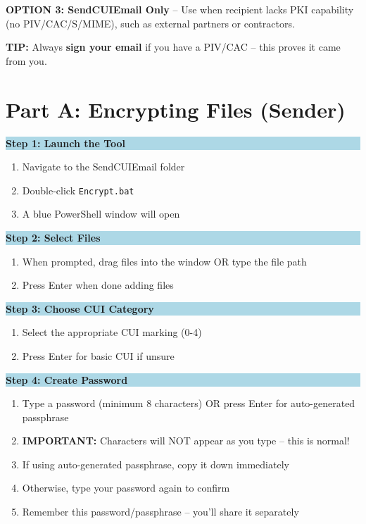 \documentclass[11pt,letterpaper]{article}
\begin{document}
\textbf{OPTION 3: SendCUIEmail Only} -- Use when recipient lacks PKI capability (no PIV/CAC/S/MIME), such as external partners or contractors.

\textbf{TIP:} Always \textbf{sign your email} if you have a PIV/CAC -- this proves it came from you.

\vspace{-0.1in}

\section*{Part A: Encrypting Files (Sender)}

\colorbox{lightblue}{\parbox{\dimexpr\textwidth-2\fboxsep}{\textbf{Step 1: Launch the Tool}}}
\begin{enumerate}[leftmargin=0.4in, topsep=2pt]
    \item Navigate to the SendCUIEmail folder
    \item Double-click \texttt{Encrypt.bat}
    \item A blue PowerShell window will open
\end{enumerate}

\colorbox{lightblue}{\parbox{\dimexpr\textwidth-2\fboxsep}{\textbf{Step 2: Select Files}}}
\begin{enumerate}[leftmargin=0.4in, topsep=2pt]
    \item When prompted, drag files into the window OR type the file path
    \item Press Enter when done adding files
\end{enumerate}

\colorbox{lightblue}{\parbox{\dimexpr\textwidth-2\fboxsep}{\textbf{Step 3: Choose CUI Category}}}
\begin{enumerate}[leftmargin=0.4in, topsep=2pt]
    \item Select the appropriate CUI marking (0-4)
    \item Press Enter for basic CUI if unsure
\end{enumerate}

\colorbox{lightblue}{\parbox{\dimexpr\textwidth-2\fboxsep}{\textbf{Step 4: Create Password}}}
\begin{enumerate}[leftmargin=0.4in, topsep=2pt]
    \item Type a password (minimum 8 characters) OR press Enter for auto-generated passphrase
    \item \textbf{IMPORTANT:} Characters will NOT appear as you type -- this is normal!
    \item If using auto-generated passphrase, copy it down immediately
    \item Otherwise, type your password again to confirm
    \item Remember this password/passphrase -- you'll share it separately
\end{enumerate}
\end{document}
